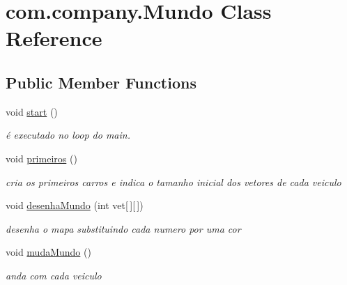 \hypertarget{classcom_1_1company_1_1_mundo}{}\section{com.\+company.\+Mundo Class Reference}
\label{classcom_1_1company_1_1_mundo}
\subsection*{Public Member Functions}
\begin{DoxyCompactItemize}
\item 
\mbox{\label{classcom_1_1company_1_1_mundo_a4a84d2b83fe16d469f53c5722b185f51}} 
void \mbox{\hyperlink{classcom_1_1company_1_1_mundo_a4a84d2b83fe16d469f53c5722b185f51}{start}} ()
\begin{DoxyCompactList}\small\item\em é executado no loop do main. \end{DoxyCompactList}\item 
\mbox{\label{classcom_1_1company_1_1_mundo_a179987e05cb0feb829ebf0d04ea5e2f4}} 
void \mbox{\hyperlink{classcom_1_1company_1_1_mundo_a179987e05cb0feb829ebf0d04ea5e2f4}{primeiros}} ()
\begin{DoxyCompactList}\small\item\em cria os primeiros carros e indica o tamanho inicial dos vetores de cada veiculo \end{DoxyCompactList}\item 
void \mbox{\hyperlink{classcom_1_1company_1_1_mundo_a68c0d4a026816da24da3055edb712e43}{desenha\+Mundo}} (int vet\mbox{[}$\,$\mbox{]}\mbox{[}$\,$\mbox{]})
\begin{DoxyCompactList}\small\item\em desenha o mapa substituindo cada numero por uma cor \end{DoxyCompactList}\item 
\mbox{\label{classcom_1_1company_1_1_mundo_af544ee726301f78e4266776a07719870}} 
void \mbox{\hyperlink{classcom_1_1company_1_1_mundo_af544ee726301f78e4266776a07719870}{muda\+Mundo}} ()
\begin{DoxyCompactList}\small\item\em anda com cada veiculo \end{DoxyCompactList}\item 

\end{DoxyCompactItemize}

